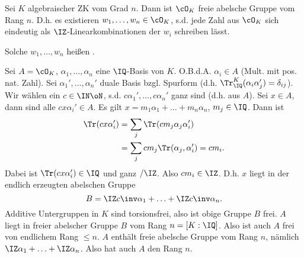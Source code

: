  \begin{Satz}
  Sei $K$ algebraischer ZK vom Grad $n$. Dann ist $\cO_K$ freie abelsche Gruppe vom Rang $n$. D.h. es existieren $w_1,\ldots,w_n\in \cO_K$, s.d. jede Zahl aus $\cO_K$ sich eindeutig als $\IZ$-Linearkombinationen der $w_i$ schreiben lässt.
 \end{Satz}
 
 \begin{Definition}
  Solche $w_1,\ldots,w_n$ heißen .
 \end{Definition}
 
 \begin{Beweis}
  Sei $A=\cO_K$, $\alpha_1,\ldots,\alpha_n$ eine $\IQ$-Basis von $K$. O.B.d.A. $\alpha_i\in A$ (Mult. mit pos. nat. Zahl). Sei $\alpha_1',\ldots,\alpha_n'$ duale Basis bzgl. Spurform (d.h. $\Tr_\IQ^K(\alpha_i\alpha_j')=\delta_{ij}$). Wir wählen ein $c\in \IN\oN$, s.d. $c\alpha_1',\ldots,c\alpha_n'$ ganz sind (d.h. aus $A$). Sei $x\in A$, dann sind alle $cx\alpha_i'\in A$.
Es gilt $x=m_1\alpha_1 + \ldots + m_n \alpha_n$, $m_j\in\IQ$. Dann ist 
\begin{align*}
 \Tr(cx\alpha_i') & = \sum_j \Tr(cm_j \alpha_j \alpha_i')\\
 &= \sum_j cm_j \Tr(\alpha_j,\alpha_i')=cm_i.
\end{align*}
Dabei ist $\Tr(cx\alpha_i')\in\IQ$ und ganz $/\IZ$. Also $cm_i\in\IZ$. D.h. $x$ liegt in der endlich erzeugten abelschen Gruppe
\[ B=\IZ c\inv \alpha_1 + \ldots + \IZ c\inv \alpha_n.\]
Additive Untergruppen in $K$ sind torsionsfrei, also ist obige Gruppe $B$ frei. $A$ liegt in freier abelscher Gruppe $B$ vom Rang $n=[K:\IQ]$.
Also ist auch $A$ frei von endlichem Rang $\leq n$. $A$ enthält freie abelsche Gruppe vom Rang $n$, nämlich $\IZ\alpha_1+\ldots + \IZ\alpha_n$. Also hat auch $A$ den Rang $n$.
 \end{Beweis}

